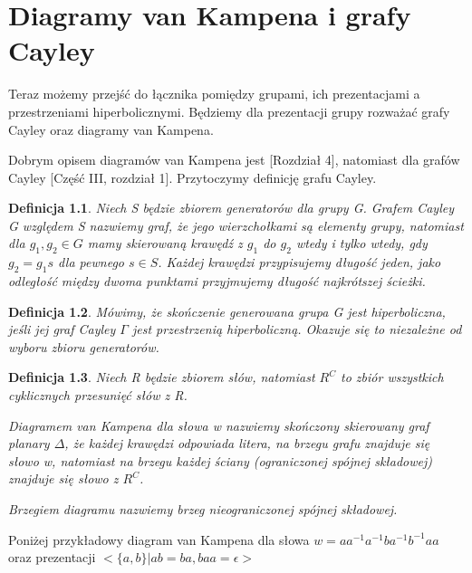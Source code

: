 \documentclass[licencjacka]{pracamgr}
\newtheorem{defi}{Definicja}[section]
\begin{document}
\chapter{Diagramy van Kampena i grafy Cayley}\label{Van Kampen, Cayley}

Teraz możemy przejść do łącznika pomiędzy grupami, ich prezentacjami a przestrzeniami hiperbolicznymi. Będziemy dla prezentacji grupy rozważać grafy Cayley oraz diagramy van Kampena.

Dobrym opisem diagramów van Kampena jest  \cite{bib:the_geometry_of_the_word_problem}[Rozdział 4], natomiast dla grafów Cayley \cite{bib:geometry_of_word_problem_fin_gen_groups}[Część III, rozdział 1]. Przytoczymy definicję grafu Cayley.

\begin{defi}

Niech S będzie zbiorem generatorów dla grupy G. Grafem Cayley G względem S nazwiemy graf, że jego wierzchołkami są elementy grupy, natomiast dla $g_1, g_2 \in G$ mamy skierowaną krawędź  z $g_1$ do $g_2$ wtedy i tylko wtedy, gdy $g_2 = g_1s$ dla pewnego $s \in S$. Każdej krawędzi przypisujemy długość jeden, jako odległość między dwoma punktami przyjmujemy długość najkrótszej ścieżki.

\end{defi}

\begin{defi}

Mówimy, że skończenie generowana grupa G jest hiperboliczna, jeśli jej graf Cayley $\Gamma$ jest przestrzenią hiperboliczną. Okazuje się to niezależne od wyboru zbioru generatorów.

\end{defi}

\begin{defi}

Niech R będzie zbiorem słów, natomiast $R^C$ to zbiór wszystkich cyklicznych przesunięć słów z R.

Diagramem van Kampena dla słowa w nazwiemy skończony skierowany graf planary $\Delta$, że każdej krawędzi odpowiada litera, na brzegu grafu znajduje się słowo w, natomiast na brzegu każdej ściany (ograniczonej spójnej składowej) znajduje się słowo z $R^C$.

Brzegiem diagramu nazwiemy brzeg nieograniczonej spójnej składowej.

\end{defi}

Poniżej przykładowy diagram van Kampena dla słowa $w = aa^{-1}a^{-1}ba^{-1}b^{-1}aa$ oraz prezentacji $< \{ a, b \} | ab = ba, baa = \epsilon >$
\end{document}
